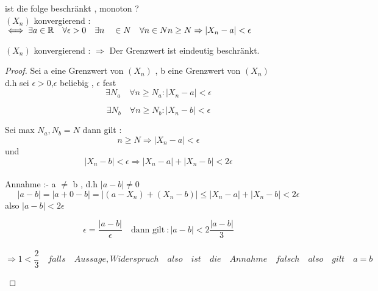 \begin{text}
    ist die folge beschränkt , monoton ?\\

    $(X_n)$ konvergierend : $\iff \exists a \in\mathbb{R} \quad \forall \epsilon > 0 \quad \exists n \quad \in N \quad \forall n \in N \quad \\
    n \geq N \Rightarrow |X_n - a |< \epsilon $
\end{text}

\begin{theorem}

    $(X_n)$ konvergierend : $\Rightarrow$ Der Grenzwert ist eindeutig beschränkt.

\end{theorem}

\begin{proof}
    Sei a eine Grenzwert von $(X_n)$ , b eine Grenzwert von $(X_n)$ \\
    d.h sei $\epsilon > 0$,$\epsilon$ beliebig , $\epsilon$ fest \\

    \begin{equation}
        \exists  N_a \quad \forall n \geq N_a : |X_n-a|< \epsilon
    \end{equation}

    \begin{equation}
        \exists  N_b \quad \forall n \geq N_b : |X_n-b|< \epsilon
    \end{equation}

    Sei max ${N_a,N_b}=N$
    dann gilt : \\
    \begin{equation}
        n \geq N \Rightarrow |X_n - a| < \epsilon
    \end{equation}
    und \begin{equation}
            |X_n -b| < \epsilon \Rightarrow |X_n -a|+|X_n - b|< 2\epsilon
    \end{equation}\\

    Annahme :- a $\neq$ b , d.h $|a-b|\neq 0 $
    \[|a-b|=|a+0-b|
    =|(a-X_n)+(X_n-b)| \leq |X_n - a|+|X_n-b|< 2 \epsilon \]
    also $|a - b|< 2 \epsilon$


    \begin{example}
        \[\epsilon = \frac{|a-b|}\epsilon
        \quad \text{dann gilt}\ :|a-b|<2 \frac{|a-b|}{3}\]\\

        \[ \Rightarrow 1 < \frac{2}{3} \quad falls \quad Aussage, Widerspruch \quad also \quad ist \quad die \quad Annahme \quad falsch \quad also \quad gilt \quad a=b\]

    \end{example}
\end{proof}

